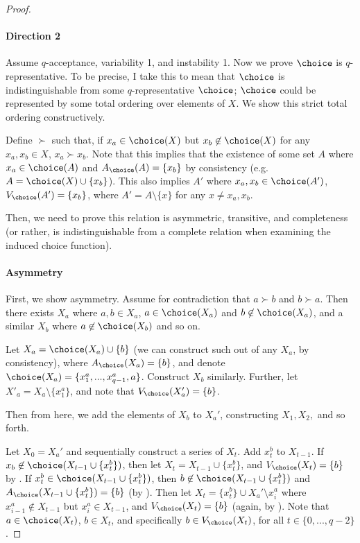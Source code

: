 \documentclass[10pt]{article}
\begin{document}
\begin{ReviewVerbatim}
\begin{proof}
\paragraph{Direction 2}
Assume $q$-acceptance, variability 1, and instability 1. Now we prove $\choice$ is $q$-representative. To be precise, I take this to mean that $\choice$ is indistinguishable from some $q$-representative $\choice$; $\choice$ could be represented by some total ordering over elements of $X$. We show this strict total ordering constructively.

Define $\succ$ such that, if $x_a \in \choice(X)$ but $x_b \not\in\choice(X)$ for any $x_a, x_b \in X$, $x_a \succ x_b$. Note that this implies that the existence of some set $A$ where $x_a \in \choice(A)$ and $A_\choice(A) = \{x_b\}$ by consistency (e.g. $A = \choice(X) \cup \{x_b\}$). This also implies $A'$ where $x_a, x_b \in \choice(A')$, $V_\choice(A') = \{x_b\}$, where $A' = A \setminus \{x\}$ for any $x \neq x_a, x_b$.

Then, we need to prove this relation is asymmetric, transitive, and completeness (or rather, is indistinguishable from a complete relation when examining the induced choice function).

\paragraph{Asymmetry}
First, we show asymmetry. Assume for contradiction that $a \succ b$ and $b \succ a$. Then there exists $X_a$ where $a, b \in X_a$, $a \in \choice(X_a)$ and $b \not\in \choice(X_a)$, and a similar $X_b$ where $a \not\in \choice(X_b)$ and so on.

Let $X_a = \choice(X_a) \cup \{b\}$ (we can construct such out of any $X_a$, by consistency), where $A_\choice(X_a) = \{b\}$, and denote $\choice(X_a) = \{x^a_1, ..., x^a_{q-1}, a\}$. Construct $X_b$ similarly. Further, let $X'_a = X_a \setminus \{x^a_1\}$, and note that $V_\choice(X_a') = \{b\}$.

Then from here, we add the elements of $X_b$ to $X_a'$, constructing $X_1, X_2,$ and so forth.

Let $X_0 = X_a'$ and sequentially construct a series of $X_t$. Add $x^b_t$ to $X_{t-1}$. If $x_b \not\in \choice(X_{t-1} \cup \{x^b_t\})$, then let $X_t = X_{t-1} \cup \{x^b_t\}$, and $V_\choice(X_t) = \{b\}$ by . If $x^b_t \in \choice(X_{t-1} \cup \{x^b_t\})$, then $b \not\in \choice(X_{t-1} \cup \{x^b_t\})$ and $A_\choice(X_{t-1} \cup \{x^b_t\}) = \{b\}$ (by ). Then let $X_t = \{x^b_t\} \cup X_a' \setminus x^a_i$ where $x^a_{i-1} \not\in X_{t-1}$ but $x^a_i \in X_{t-1}$, and $V_\choice(X_t) = \{b\}$ (again, by ). Note that $a \in \choice(X_t)$, $b \in X_t$, and specifically $b \in V_\choice(X_t)$, for all $t \in \{0,..., q-2\}$.


\end{proof}
\end{ReviewVerbatim}
\end{document}
